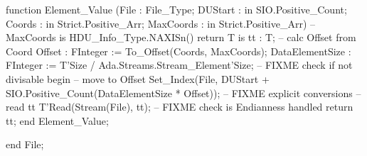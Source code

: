 function Element_Value
		(File : File_Type; 
		DUStart   : in SIO.Positive_Count;
		Coords    : in Strict.Positive_Arr;
		MaxCoords : in Strict.Positive_Arr) 
		-- MaxCoords is HDU_Info_Type.NAXISn() 
 return T
is
	tt : T;
	-- calc Offset from Coord	
	Offset : FInteger := To_Offset(Coords, MaxCoords);
	DataElementSize : FInteger := T'Size / Ada.Streams.Stream_Element'Size;
	-- FIXME check if not divisable
begin
	-- move to Offset
	Set_Index(File, DUStart + SIO.Positive_Count(DataElementSize * Offset));
					-- FIXME explicit conversions
	-- read tt
	T'Read(Stream(File), tt);
	-- FIXME check is Endianness handled
	return tt;
end Element_Value;



end File;

